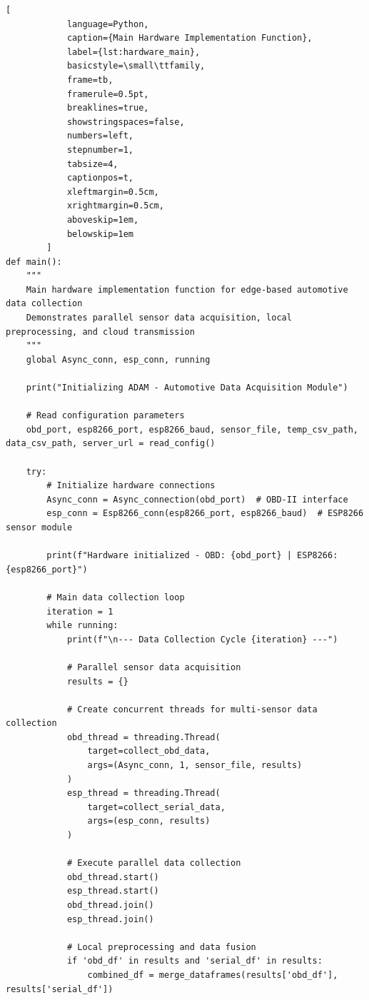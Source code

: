        \begin{lstlisting}[
            language=Python,
            caption={Main Hardware Implementation Function},
            label={lst:hardware_main},
            basicstyle=\small\ttfamily,
            frame=tb,
            framerule=0.5pt,
            breaklines=true,
            showstringspaces=false,
            numbers=left,
            stepnumber=1,
            tabsize=4,
            captionpos=t,
            xleftmargin=0.5cm,
            xrightmargin=0.5cm,
            aboveskip=1em,
            belowskip=1em
        ]
def main():
    """
    Main hardware implementation function for edge-based automotive data collection
    Demonstrates parallel sensor data acquisition, local preprocessing, and cloud transmission
    """
    global Async_conn, esp_conn, running
    
    print("Initializing ADAM - Automotive Data Acquisition Module")
    
    # Read configuration parameters
    obd_port, esp8266_port, esp8266_baud, sensor_file, temp_csv_path, data_csv_path, server_url = read_config()
    
    try:
        # Initialize hardware connections
        Async_conn = Async_connection(obd_port)  # OBD-II interface
        esp_conn = Esp8266_conn(esp8266_port, esp8266_baud)  # ESP8266 sensor module
        
        print(f"Hardware initialized - OBD: {obd_port} | ESP8266: {esp8266_port}")
        
        # Main data collection loop
        iteration = 1
        while running:
            print(f"\n--- Data Collection Cycle {iteration} ---")
            
            # Parallel sensor data acquisition
            results = {}
            
            # Create concurrent threads for multi-sensor data collection
            obd_thread = threading.Thread(
                target=collect_obd_data, 
                args=(Async_conn, 1, sensor_file, results)
            )
            esp_thread = threading.Thread(
                target=collect_serial_data,
                args=(esp_conn, results)
            )
            
            # Execute parallel data collection
            obd_thread.start()
            esp_thread.start()
            obd_thread.join()
            esp_thread.join()
            
            # Local preprocessing and data fusion
            if 'obd_df' in results and 'serial_df' in results:
                combined_df = merge_dataframes(results['obd_df'], results['serial_df'])
                

\end{lstlisting}
